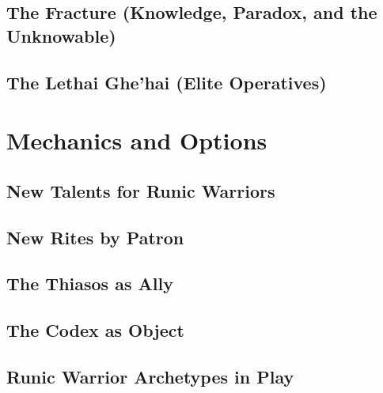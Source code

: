 \documentclass[11pt,letterpaper]{book}
\newcommand{\cfile}[1]{}
\begin{document}
\chapter{The Fracture (Knowledge, Paradox, and the Unknowable)}
\cfile{patrons/fracture/01_the_ninth}
\cfile{patrons/fracture/02_lunara}

\chapter{The Lethai Ghe'hai (Elite Operatives)}
\cfile{patrons/lethai/01_ghehai_syncretic}

\part{Mechanics and Options}

\chapter{New Talents for Runic Warriors}
\cfile{mechanics/01_foundation_talents}
\cfile{mechanics/02_advanced_talents}
\cfile{mechanics/03_prestige_talents}
\cfile{mechanics/04_patron_specific_talents}

\chapter{New Rites by Patron}
\cfile{mechanics/01_rites_vowed}
\cfile{mechanics/02_rites_threshold}
\cfile{mechanics/03_rites_wild}
\cfile{mechanics/04_rites_deep}
\cfile{mechanics/05_rites_shadow}
\cfile{mechanics/06_rites_web}
\cfile{mechanics/07_rites_forge}
\cfile{mechanics/08_rites_grave}
\cfile{mechanics/09_rites_fracture}
\cfile{mechanics/10_rites_lethai}

\chapter{The Thiasos as Ally}
\cfile{thiasos/01_core_rules}
\cfile{thiasos/02_living_thiasos}
\cfile{thiasos/03_sentient_thiasos_optional}
\cfile{thiasos/04_sentient_thiasos_by_patron}
\cfile{thiasos/05_sentient_thiasos_talents}

\chapter{The Codex as Object}
\cfile{codex/01_core_rules}
\cfile{codex/02_codex_by_patron}
\cfile{codex/03_codex_and_thiasos_unified}

\chapter{Runic Warrior Archetypes in Play}
\cfile{archetypes/01_dawn_warrior}
\cfile{archetypes/02_bloodsworn}
\cfile{archetypes/03_ghehai_operative}
\cfile{archetypes/04_beast_warrior}
\cfile{archetypes/05_fractal_warrior}
\cfile{archetypes/06_hybrid_builds}
\end{document}
